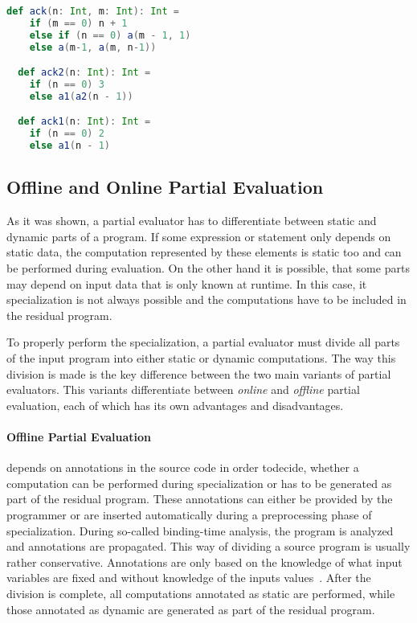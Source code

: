 \begin{lstlisting}[language=scala,caption={Definition of the \texttt{ackermann} function and its specialization.},label={lst:pps}]
  def ack(n: Int, m: Int): Int =
    if (m == 0) n + 1
    else if (n == 0) a(m - 1, 1)
    else a(m-1, a(m, n-1))

  def ack2(n: Int): Int =
    if (n == 0) 3
    else a1(a2(n - 1))

  def ack1(n: Int): Int =
    if (n == 0) 2
    else a1(n - 1)
\end{lstlisting}



\subsection{Offline and Online Partial Evaluation}\label{sec:offline-vs-online}

As it was shown, a partial evaluator has to differentiate between static and dynamic parts of a program.
If some expression or statement only depends on static data, the computation represented by these elements is static too and can be performed during evaluation.
On the other hand it is possible, that some parts may depend on input data that is only known at runtime.
In this case, it specialization is not always possible and the computations have to be included in the residual program.

To properly perform the specialization, a partial evaluator must divide all parts of the input program into either static or dynamic computations.
The way this division is made is the key difference between the two main variants of partial evaluators.
This variants differentiate between \textit{online} and \textit{offline} partial evaluation, each of which has its own advantages and disadvantages.

\paragraph{Offline Partial Evaluation}
depends on annotations in the source code in order to\linebreak decide, whether a computation can be performed during specialization or has to be generated as part of the residual program.
These annotations can either be provided by the programmer or are inserted automatically during a preprocessing phase of specialization.
During so-called binding-time analysis, the program is analyzed and annotations are propagated.
This way of dividing a source program is usually rather conservative.
Annotations are only based on the knowledge of what input variables are fixed and without knowledge of the inputs values~\cite[Chap. 7]{Jones_PartialEvaluation}.
After the division is complete, all computations annotated as static are performed, while those annotated as dynamic are generated as part of the residual program.


